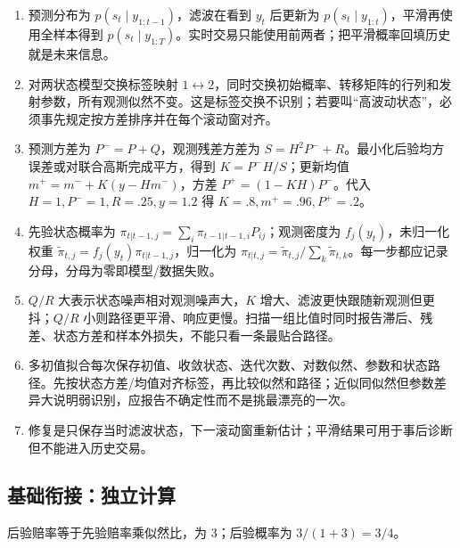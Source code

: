 
\begin{enumerate}[leftmargin=*]
  \item 预测分布为 $p(s_t\mid y_{1:t-1})$，滤波在看到 $y_t$ 后更新为 $p(s_t\mid y_{1:t})$，平滑再使用全样本得到 $p(s_t\mid y_{1:T})$。实时交易只能使用前两者；把平滑概率回填历史就是未来信息。
  \item 对两状态模型交换标签映射 $1\leftrightarrow2$，同时交换初始概率、转移矩阵的行列和发射参数，所有观测似然不变。这是标签交换不识别；若要叫“高波动状态”，必须事先规定按方差排序并在每个滚动窗对齐。
  \item 预测方差为 $P^-=P+Q$，观测残差方差为 $S=H^2P^-+R$。最小化后验均方误差或对联合高斯完成平方，得到 $K=P^-H/S$；更新均值 $m^+=m^-+K(y-Hm^-)$，方差 $P^+=(1-KH)P^-$。代入 $H=1,P^-=1,R=.25,y=1.2$ 得 $K=.8,m^+=.96,P^+=.2$。
  \item 先验状态概率为 $\pi_{t|t-1,j}=\sum_i\pi_{t-1|t-1,i}P_{ij}$；观测密度为 $f_j(y_t)$，未归一化权重 $\tilde\pi_{t,j}=f_j(y_t)\pi_{t|t-1,j}$，归一化为 $\pi_{t|t,j}=\tilde\pi_{t,j}/\sum_k\tilde\pi_{t,k}$。每一步都应记录分母，分母为零即模型/数据失败。
  \item $Q/R$ 大表示状态噪声相对观测噪声大，$K$ 增大、滤波更快跟随新观测但更抖；$Q/R$ 小则路径更平滑、响应更慢。扫描一组比值时同时报告滞后、残差、状态方差和样本外损失，不能只看一条最贴合路径。
  \item 多初值拟合每次保存初值、收敛状态、迭代次数、对数似然、参数和状态路径。先按状态方差/均值对齐标签，再比较似然和路径；近似同似然但参数差异大说明弱识别，应报告不确定性而不是挑最漂亮的一次。
  \item 修复是只保存当时滤波状态，下一滚动窗重新估计；平滑结果可用于事后诊断但不能进入历史交易。
\end{enumerate}

\subsection*{基础衔接：独立计算}
后验赔率等于先验赔率乘似然比，为 3；后验概率为 $3/(1+3)=3/4$。
